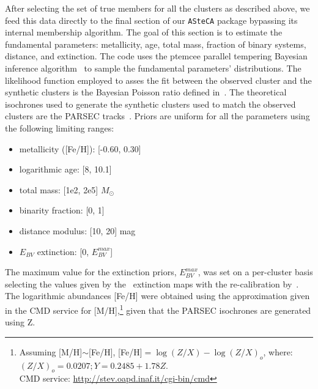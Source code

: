 \documentclass[draft]{aa}
\begin{document}
  After selecting the set of true members for all the clusters as described
  above, we feed this data directly to the final section of our 
  \texttt{ASteCA} package bypassing its internal membership algorithm. 
  The goal of this section is to estimate
  the fundamental parameters: metallicity, age, total mass, fraction of binary
  systems, distance, and extinction. The code uses the ptemcee parallel
  tempering Bayesian inference algorithm~\citep{ptemcee} to sample the
  fundamental parameters' distributions. The likelihood function employed to
  asses the fit between the observed cluster and the synthetic clusters is the
  Bayesian Poisson ratio defined in~\cite{Tremmel_2013}.
  The theoretical isochrones used to generate the
  synthetic clusters used to match the observed clusters are the PARSEC
  tracks~\citep{Bressan_2012}. Priors are uniform for all the parameters using
  the following limiting ranges:

  \begin{itemize}
   \item metallicity ([Fe/H]): [-0.60, 0.30]
   \item logarithmic age: [8, 10.1]
   \item total mass: [1e2, 2e5] $M_{\odot}$
   \item binarity fraction: [0, 1]
   \item distance modulus: [10, 20] mag
   \item $E_{BV}$ extinction: [0, $E_{BV}^{max}$]
  \end{itemize}

  \noindent The maximum value for the extinction priors, $E_{BV}^{max}$, was set
  on a per-cluster basis selecting the values given by the~\cite{Schlegel_1998}
  extinction maps with the re-calibration by~\cite{Schlafly_2011}.
  The logarithmic abundances [Fe/H] were obtained using the approximation given
  in the CMD service for [M/H],\footnote{Assuming [M/H]$\sim$[Fe/H], [Fe/H]$=\log(Z/X)-\log(Z/X)_{o}$, where:
  $(Z/X)_{o}=0.0207; Y=0.2485+1.78Z$.\\
  CMD service: \url{http://stev.oapd.inaf.it/cgi-bin/cmd}} given that the
  PARSEC isochrones are generated using Z.
\end{document}
